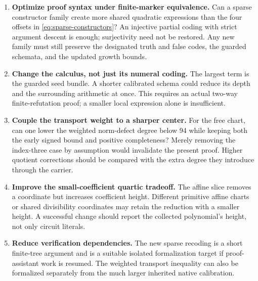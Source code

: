 \documentclass[11pt,letterpaper]{article}
\theoremstyle{remark}\newtheorem{remark}[theorem]{Remark}
\begin{document}
\begin{enumerate}
\item \textbf{Optimize proof syntax under finite-marker equivalence.}
Can a sparse constructor family create more shared quadratic expressions
than the four offsets in \eqref{eq:sparse-constructors}? An injective
partial coding with strict argument descent is enough; surjectivity
need not be restored. Any new family must still preserve the designated
truth and false codes, the guarded schemata, and the updated growth bounds.
\item \textbf{Change the calculus, not just its numeral coding.}
The largest term is the guarded seed bundle. A shorter calibrated
schema could reduce its depth and the surrounding arithmetic at once.
This requires an actual two-way finite-refutation proof; a smaller
local expression alone is insufficient.
\item \textbf{Couple the transport weight to a sharper center.}
For the free chart, can one lower the weighted norm-defect degree below
94 while keeping both the early signed bound and positive completeness?
Merely removing the index-three case by assumption would invalidate
the present proof. Higher quotient corrections should be compared
with the extra degree they introduce through the carrier.
\item \textbf{Improve the small-coefficient quartic tradeoff.}
The affine slice removes a coordinate but increases coefficient height.
Different primitive affine charts or shared divisibility coordinates
may retain the reduction with a smaller height. A successful change
should report the collected polynomial's height, not only circuit literals.
\item \textbf{Reduce verification dependencies.}
The new sparse recoding is a short finite-tree argument and is a suitable
isolated formalization target if proof-assistant work is resumed.
The weighted transport inequality can also be formalized separately
from the much larger inherited native calibration.
\end{enumerate}
\end{document}
